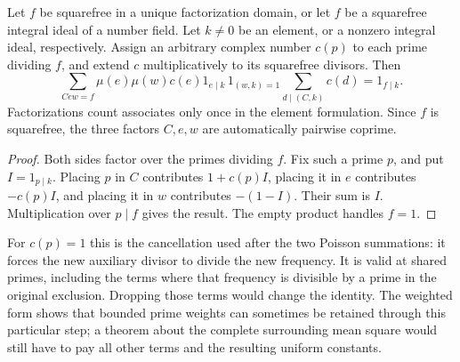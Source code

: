 \begin{proposition}
\label{prop:qrh-factorization}
Let $f$ be squarefree in a unique factorization domain, or let
$f$ be a squarefree integral ideal of a number field. Let $k\ne0$
be an element, or a nonzero integral ideal, respectively.
Assign an arbitrary complex number $c(p)$ to each prime dividing
$f$, and extend $c$ multiplicatively to its squarefree divisors.
Then
\[
 \sum_{Cew=f}\mu(e)\mu(w)c(e)
    1_{e\mid k}\,1_{(w,k)=1}
           \sum_{d\mid(C,k)}c(d)
       =1_{f\mid k}.
\]
Factorizations count associates only once in the element formulation.
Since $f$ is squarefree, the three factors $C,e,w$ are automatically
pairwise coprime.
\end{proposition}
\begin{proof}
Both sides factor over the primes dividing $f$. Fix such a prime
$p$, and put $I=1_{p\mid k}$. Placing $p$ in $C$ contributes
$1+c(p)I$, placing it in $e$ contributes $-c(p)I$, and placing
it in $w$ contributes $-(1-I)$. Their sum is $I$. Multiplication
over $p\mid f$ gives the result. The empty product handles $f=1$.
\end{proof}

For $c(p)=1$ this is the cancellation used after the two Poisson
summations: it forces the new auxiliary divisor to divide the new
frequency. It is valid at shared primes, including the terms where
that frequency is divisible by a prime in the original exclusion.
Dropping those terms would change the identity. The weighted form
shows that bounded prime weights can sometimes be retained through
this particular step; a theorem about the complete surrounding
mean square would still have to pay all other terms and the
resulting uniform constants.



